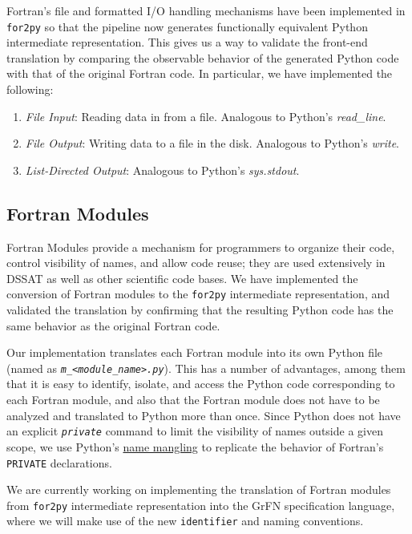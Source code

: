 \documentclass[article, 12pt, oneside]{memoir}
\begin{document}
Fortran's file and formatted I/O handling mechanisms have been
implemented in \texttt{for2py} so that the pipeline now generates
functionally equivalent Python intermediate representation. This gives
us a way to validate the front-end translation by comparing the
observable behavior of the generated Python code with that of the
original Fortran code. In particular, we have implemented the following:

\begin{enumerate}
\def\labelenumi{\arabic{enumi}.}
\tightlist
\item
  \emph{File Input}: Reading data in from a file. Analogous to Python's
  \emph{read\_line}.
\item
  \emph{File Output}: Writing data to a file in the disk. Analogous to
  Python's \emph{write}.
\item
  \emph{List-Directed Output}: Analogous to Python's \emph{sys.stdout}.
\end{enumerate}

\hypertarget{fortran-modules}{%
\subsection{Fortran Modules}\label{fortran-modules}}

Fortran Modules provide a mechanism for programmers to organize their
code, control visibility of names, and allow code reuse; they are used
extensively in DSSAT as well as other scientific code bases. We have
implemented the conversion of Fortran modules to the \texttt{for2py}
intermediate representation, and validated the translation by confirming
that the resulting Python code has the same behavior as the original
Fortran code.

Our implementation translates each Fortran module into its own Python
file (named as
\emph{\texttt{m\_\textless{}module\_name\textgreater{}.py}}). This has a
number of advantages, among them that it is easy to identify, isolate,
and access the Python code corresponding to each Fortran module, and
also that the Fortran module does not have to be analyzed and translated
to Python more than once. Since Python does not have an explicit
\emph{\texttt{private}} command to limit the visibility of names outside
a given scope, we use Python's
\href{https://docs.python.org/2/tutorial/classes.html\#private-variables-and-class-local-references}{name
mangling} to replicate the behavior of Fortran's \texttt{PRIVATE}
declarations.

We are currently working on implementing the translation of Fortran
modules from \texttt{for2py} intermediate representation into the GrFN
specification language, where we will make use of the new
\texttt{identifier} and naming conventions.
\end{document}

